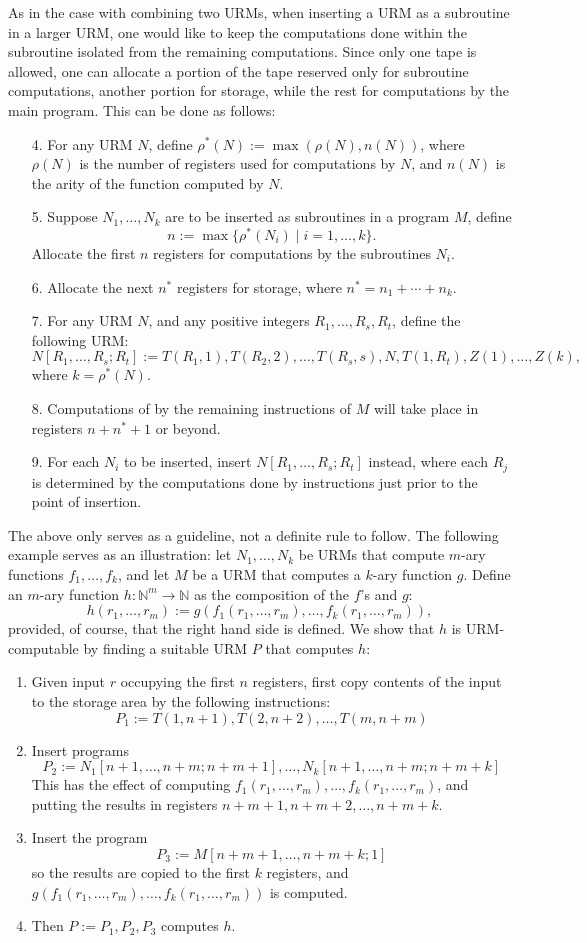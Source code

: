 \documentclass[12pt]{article}
\begin{document}
As in the case with combining two URMs, when inserting a URM as a subroutine in a larger URM, one would like to keep the computations done within the subroutine isolated from the remaining computations.  Since only one tape is allowed, one can allocate a portion of the tape reserved only for subroutine computations, another portion for storage, while the rest for computations by the main program.  This can be done as follows:
\begin{enumerate}
\item[4.] For any URM $N$, define $\rho^*(N):=\max(\rho(N),n(N))$, where $\rho(N)$ is the number of registers used for computations by $N$, and $n(N)$ is the arity of the function computed by $N$.
\item[5.] Suppose $N_1,\ldots, N_k$ are to be inserted as subroutines in a program $M$, define $$n:=\max \lbrace \rho^*(N_i) \mid i=1,\ldots, k\rbrace.$$ Allocate the first $n$ registers for computations by the subroutines $N_i$.
\item[6.] Allocate the next $n^*$ registers for storage, where $n^*=n_1 + \cdots + n_k$.
\item[7.] For any URM $N$, and any positive integers $R_1,\ldots,R_s,R_t$, define the following URM:
$$N[R_1,\ldots, R_s; R_t]:=T(R_1,1),T(R_2,2),\ldots, T(R_s,s), N, T(1,R_t),Z(1),\ldots, Z(k),$$
where $k=\rho^*(N)$.
\item[8.] Computations of by the remaining instructions of $M$ will take place in registers $n+n^*+1$ or beyond.
\item[9.] For each $N_i$ to be inserted, insert $N[R_1,\ldots, R_s; R_t]$ instead, where each $R_j$ is determined by the computations done by instructions just prior to the point of insertion.
\end{enumerate}
The above only serves as a guideline, not a definite rule to follow.  The following example serves as an illustration: let $N_1,\ldots,N_k$ be URMs that compute $m$-ary functions $f_1,\ldots,f_k$, and let $M$ be a URM that computes a $k$-ary function $g$.  Define an $m$-ary function $h:\mathbb{N}^m\to \mathbb{N}$ as the composition of the $f$'s and $g$: $$h(r_1,\ldots, r_m):=g(f_1(r_1,\ldots, r_m),\ldots,f_k(r_1,\ldots, r_m)),$$ provided, of course, that the right hand side is defined.  We show that $h$ is URM-computable by finding a suitable URM $P$ that computes $h$:  
\begin{enumerate}
\item Given input $r$ occupying the first $n$ registers, first copy contents of the input to the storage area by the following instructions: $$P_1:=T(1,n+1),T(2,n+2),\ldots, T(m,n+m)$$
\item Insert programs $$P_2:=N_1[n+1,\ldots, n+m; n+m+1], \ldots, N_k[n+1,\ldots, n+m; n+m+k]$$
This has the effect of computing $f_1(r_1,\ldots, r_m),\ldots,f_k(r_1,\ldots, r_m)$, and putting the results in registers $n+m+1,n+m+2,\ldots, n+m+k$.
\item Insert the program $$P_3:=M[n+m+1,\ldots, n+m+k;1]$$ so the results are copied to the first $k$ registers, and $g(f_1(r_1,\ldots, r_m),\ldots,f_k(r_1,\ldots, r_m))$ is computed.
\item Then $P:=P_1,P_2,P_3$ computes $h$.
\end{enumerate}
\end{document}
